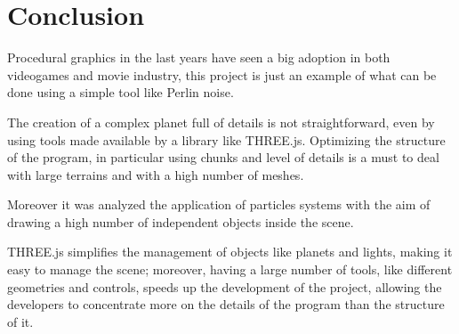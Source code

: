 \documentclass[paper=a4, fontsize=11pt]{scrartcl} %
\numberwithin{equation}{section} %
\numberwithin{figure}{section} %
\numberwithin{table}{section} %
\theoremstyle{definition}
\begin{document}

\section{Conclusion}

Procedural graphics in the last years have seen a big adoption in both videogames
and movie industry, this project is just an example of what can be done using
a simple tool like Perlin noise.

The creation of a complex planet full of details is not straightforward, even
by using tools made available by a library like THREE.js. Optimizing the structure of the program, in particular using chunks and
level of details is a must to deal with large terrains and with a high number
of meshes.

Moreover it was analyzed the application of particles systems with the aim of drawing 
a high number of independent objects inside the scene.

THREE.js simplifies the management of objects like planets and lights, making
it easy to manage the scene; moreover, having a large number of tools, like
different geometries and controls, speeds up the development of the project,
allowing the developers to concentrate more on the details of the program
than the structure of it.


\newpage



\end{document}
